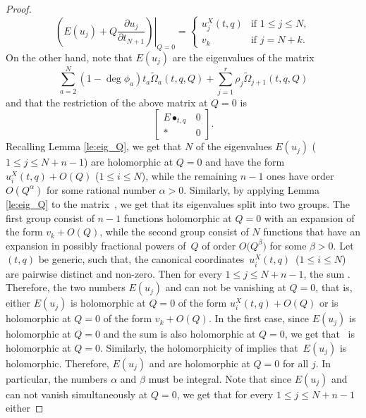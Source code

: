 \documentclass[10pt,a4paper]{article}
\numberwithin{equation}{section}
\begin{document}
\begin{proof}
\[
\left.
\left(
E(u_j) + Q\frac{\partial u_j}{\partial t_{N+1}}
\right)
\right|_{Q=0} =
\begin{cases}
u_j^X(t,q) & \mbox{if } 1\leq j\leq N,\\
v_k & \mbox{if } j=N+k.
\end{cases}
\]
On the other hand, note that $E(u_j)$ are the eigenvalues of the matrix
\[
\sum_{a=2}^N (1-\operatorname{deg}\phi_a)
t_a \widetilde{\Omega}_a(t,q,Q) +
\sum_{j=1}^r \rho_j \widetilde{\Omega}_{j+1}(t,q,Q)
\]
and that the restriction of the above matrix at $Q=0$ is
\[
\begin{bmatrix}
E\bullet_{t,q} & 0 \\
* & 0
\end{bmatrix}.
\]
Recalling Lemma \ref{le:eig_Q}, we get that $N$ of the eigenvalues $E(u_j)$ ($1\leq j\leq N+n-1$) are holomorphic at $Q=0$ and have the form $u_i^X(t,q)+O(Q)$ ($1\leq i\leq N$), while the remaining $n-1$ ones have order~$O(Q^\alpha)$ for some rational number $\alpha>0$. Similarly, by applying Lemma \ref{le:eig_Q} to the matrix~, we get that its eigenvalues  split into two groups. The first group consist of $n-1$ functions holomorphic at $Q=0$ with an expansion of the form $v_k + O(Q)$, while the second group consist of $N$ functions that have an expansion in possibly fractional powers of~$Q$ of order $O\big(Q^\beta\big)$ for some $\beta>0$. Let $(t,q)$ be generic, such that, the canonical coordinates~${u_i^X(t,q)}$~($1\leq i\leq N$) are pairwise distinct and non-zero. Then for every $1\leq j\leq N+n-1$, the sum . Therefore, the two numbers $E(u_j)$ and  can not be vanishing at $Q=0$, that is, either $E(u_j)$ is holomorphic at $Q=0$ of the form $u_i^X(t,q)+O(Q)$ or  is holomorphic at $Q=0$ of the form $v_k+O(Q)$. In the first case, since $E(u_j)$ is holomorphic at $Q=0$ and the sum  is also holomorphic at $Q=0$, we get that~ is holomorphic at $Q=0$. Similarly, the holomorphicity of  implies that~$E(u_j)$ is holomorphic. Therefore, $E(u_j)$ and  are holomorphic at $Q=0$ for all $j$. In particular, the numbers $\alpha$ and $\beta$ must be integral. Note that since $E(u_j)$ and  can not vanish simultaneously at $Q=0$, we get that for every $1\leq j\leq N+n-1$ either

\end{proof}
\end{document}
